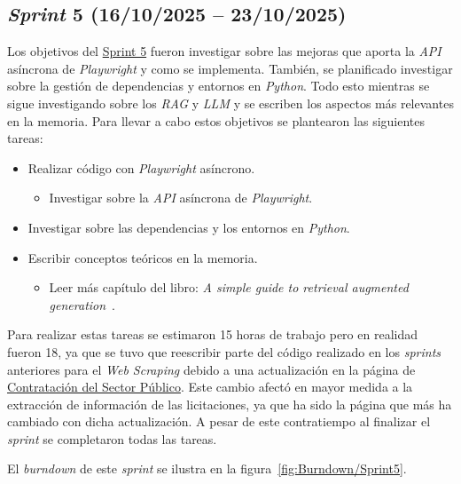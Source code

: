 \subsection{\textit{Sprint} 5 (16/10/2025 -- 23/10/2025)}
Los objetivos del \href{https://github.com/lbr1014/TFG_RAG/milestone/5?closed=1}{Sprint 5} fueron investigar sobre las mejoras que aporta la \textit{API} asíncrona de \textit{Playwright} y como se implementa. También, se planificado investigar sobre la gestión de dependencias y entornos en \textit{Python}. Todo esto mientras se sigue investigando sobre los \textit{RAG} y \textit{LLM} y se escriben los aspectos más relevantes en la memoria. 
Para llevar a cabo estos objetivos se plantearon las siguientes tareas:
\begin{itemize}
\tightlist
	\item Realizar código con \textit{Playwright} asíncrono.
	\begin{itemize}
	\tightlist
		\item Investigar sobre la \textit{API} asíncrona de \textit{Playwright}.
	\end{itemize}
	\item Investigar sobre las dependencias y los entornos en \textit{Python}.
	\item Escribir conceptos teóricos en la memoria.
	\begin{itemize}
	\tightlist
		\item Leer más capítulo del libro: \textit{A simple guide to retrieval augmented generation}~\cite{book:RAG_SimpleGuide}.
	\end{itemize}
\end{itemize}

Para realizar estas tareas se estimaron 15 horas de trabajo pero en realidad fueron 18, ya que se tuvo que reescribir parte del código realizado en los \textit{sprints} anteriores para el \textit{Web Scraping} debido a una actualización en la página de \href{https://contrataciondelestado.es/wps/portal/plataforma/inicio/!ut/p/z1/04_Sj9CPykssy0xPLMnMz0vMAfIjo8zinYItLBydDB0NDIxDLQwczQIDnS1dDIwMLI31wwkpiAJKG-AAjgZA_VFgJabGziZhXmEBZsGe7gYGnh5uLj6hhqYG7kZmUAV4zCjIjTDIdFRUBAD_nKPx/dz/d5/L2dBISEvZ0FBIS9nQSEh/}{Contratación del Sector Público}. Este cambio afectó en mayor medida a la extracción de información de las licitaciones, ya que ha sido la página que más ha cambiado con dicha actualización. A pesar de este contratiempo al finalizar el \textit{sprint} se completaron todas las tareas.

El \textit{burndown} de este \textit{sprint} se ilustra en la figura~\ref{fig:Burndown/Sprint5}.


